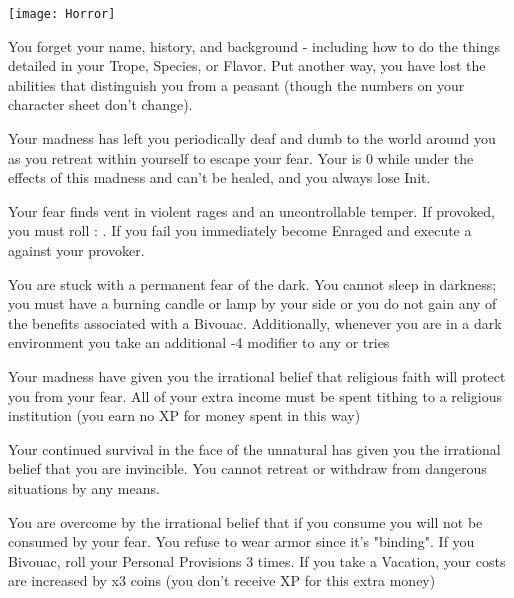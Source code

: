 {  \newpage

  \begin{center}
  \texttt{[image: Horror]}
  \end{center}


  You forget your name, history, and background - including how to do the things detailed in your Trope, Species, or Flavor.  Put another way, you have lost the abilities that distinguish you from a peasant (though the numbers on your character sheet don't change).


  Your madness has left you periodically deaf and dumb to the world around you as you retreat within yourself to escape your fear. Your  is 0 while under the effects of this madness and can't be healed, and you always lose Init.


  Your fear finds vent in violent rages and an uncontrollable temper. If provoked, you must roll \RS : \FOC.  If you fail you immediately become Enraged and execute a  against your provoker.


  You are stuck with a permanent fear of the dark. You cannot sleep in darkness; you must have a burning candle or lamp by your side or you do not gain any of the benefits associated with a Bivouac. Additionally, whenever you are in a dark environment you take an additional -4 modifier to any \RO or \RB tries


  Your madness have given you the irrational belief that religious faith will protect you from your fear. All of your extra income must be spent tithing to a religious institution (you earn no XP for money spent in this way)


  Your continued survival in the face of the unnatural has given you the irrational belief that you are invincible. You cannot retreat or withdraw from dangerous situations by any means.


  You are overcome by the irrational belief that if you consume you will not be consumed by your fear. You refuse to wear armor since it's "binding".  If you Bivouac, roll your Personal Provisions 3 times.  If you take a Vacation, your costs are increased by x3 coins (you don't receive XP for this extra money)

}
